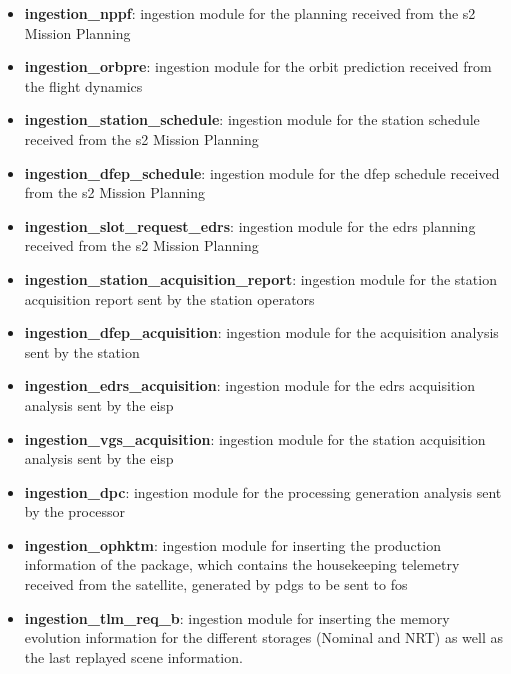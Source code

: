 \begin{itemize} 

\item \textbf{ingestion\_nppf}: ingestion module for the planning received from the \acrshort{s2} Mission Planning

\item \textbf{ingestion\_orbpre}: ingestion module for the orbit prediction received from the flight dynamics

\item \textbf{ingestion\_station\_schedule}: ingestion module for the station schedule received from the \acrshort{s2} Mission Planning

\item \textbf{ingestion\_dfep\_schedule}: ingestion module for the \acrshort{dfep} schedule received from the \acrshort{s2} Mission Planning

\item \textbf{ingestion\_slot\_request\_edrs}: ingestion module for the \acrshort{edrs} planning received from the \acrshort{s2} Mission Planning

\item \textbf{ingestion\_station\_acquisition\_report}: ingestion module for the station acquisition report sent by the station operators

\item \textbf{ingestion\_dfep\_acquisition}: ingestion module for the acquisition analysis sent by the station

\item \textbf{ingestion\_edrs\_acquisition}: ingestion module for the \acrshort{edrs} acquisition analysis sent by the \acrshort{eisp}

\item \textbf{ingestion\_vgs\_acquisition}: ingestion module for the station acquisition analysis sent by the \acrshort{eisp}

\item \textbf{ingestion\_dpc}: ingestion module for the processing generation analysis sent by the processor

\item \textbf{ingestion\_ophktm}: ingestion module for inserting the production information of the package, which contains the housekeeping telemetry received from the satellite, generated by \acrshort{pdgs} to be sent to \acrshort{fos}

\item \textbf{ingestion\_tlm\_req\_b}: ingestion module for inserting the memory evolution information for the different storages (Nominal and NRT) as well as the last replayed scene information.


\end{itemize}
